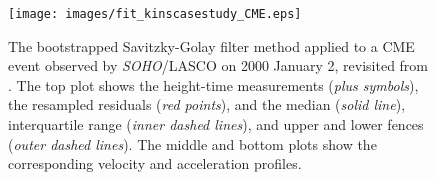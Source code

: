 \documentclass[referee]{aa}
\begin{document}
\begin{figure}[!t]
\centering
\texttt{[image: images/fit\_kinscasestudy\_CME.eps]}
\caption{The bootstrapped Savitzky-Golay filter method applied to a CME event observed by \emph{SOHO}/LASCO on 2000 January 2, revisited from \citet{2009A&A...495..325B}. The top plot shows the height-time measurements (\emph{plus symbols}), the resampled residuals (\emph{red points}), and the median (\emph{solid line}), interquartile range (\emph{inner dashed lines}), and upper and lower fences (\emph{outer dashed lines}). The middle and bottom plots show the corresponding velocity and acceleration profiles.}
\label{fig_savgol_CME}
\end{figure}

\begin{figure}[!t]
\centering
{}

\end{figure}
\end{document}
